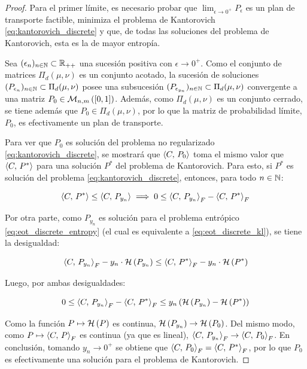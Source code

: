 \begin{proof}
	Para el primer límite, es necesario probar que $\lim_{\epsilon\to 0^+} P_\epsilon$ es un plan de transporte factible, minimiza el problema de Kantorovich \eqref{eq:kantorovich_discrete} y que, de todas las soluciones del problema de Kantorovich, esta es la de mayor entropía.

	Sea $(\epsilon_n)_{n\in\mathbb{N}}\subset\mathbb{R}_{++}$ una sucesión positiva con $\epsilon\to 0^+$. Como el conjunto de matrices $\Pi_d(\mu,\nu)$ es un conjunto acotado, la sucesión de soluciones $(P_{\epsilon_n})_{n\in\mathbb{N}}\subset\Pi_d(\mu,\nu)$ posee una subsucesión $(P_{\epsilon_{y_n}})_{n\in\mathbb{N}}\subset\Pi_d(\mu,\nu)$ convergente a una matriz $P_0\in\mathcal{M}_{n,m}\left([0,1]\right)$. Además, como $\Pi_d(\mu,\nu)$ es un conjunto cerrado, se tiene además que $P_0\in\Pi_d(\mu,\nu)$, por lo que la matriz de probabilidad límite, $P_0$, es efectivamente un plan de transporte.

	Para ver que $P_0$ es solución del problema no regularizado \eqref{eq:kantorovich_discrete}, se mostrará que $\left\langle C,\,P_0\right\rangle$ toma el mismo valor que $\left\langle C,\,P^*\right\rangle$ para una solución $P^*$ del problema de Kantorovich. Para esto, si $P^*$ es solución del problema \eqref{eq:kantorovich_discrete}, entonces, para todo $n\in\mathbb{N}$:

	\begin{equation*}
		\left\langle C,\,P^*\right\rangle \leq \left\langle C,\,P_{y_n}\right\rangle
		\implies
		0 \leq \left\langle C,\,P_{y_n}\right\rangle_F - \left\langle C,\,P^*\right\rangle_F
	\end{equation*}

	Por otra parte, como $P_{y_n}$ es solución para el problema entrópico \eqref{eq:eot_discrete_entropy} (el cual es equivalente a \eqref{eq:eot_discrete_kl}), se tiene la desigualdad:

	\begin{equation*}
		\left\langle C,\,P_{y_n}\right\rangle_F - y_n\cdot\mathcal{H}\left(P_{y_n}\right)
		\leq \left\langle C,\,P^*\right\rangle_F - y_n\cdot\mathcal{H}\left(P^*\right)
	\end{equation*}

	Luego, por ambas desigualdades:

	\begin{equation}
		\label{eq:eot_convergence_proof}
		0 \leq \left\langle C,\,P_{y_n}\right\rangle_F - \left\langle C,\,P^*\right\rangle_F
		\leq y_n\left(\mathcal{H}\left(P_{y_n}\right) - \mathcal{H}\left(P^*\right)\right)
	\end{equation}

	Como la función $P\mapsto\mathcal{H}\left(P\right)$ es continua, $\mathcal{H}\left(P_{y_n}\right) \to \mathcal{H}\left(P_0\right)$. Del mismo modo, como $P\mapsto\left\langle C,\,P\right\rangle_F$ es continua (ya que es lineal), $\left\langle C,\,P_{y_n}\right\rangle_F\to\left\langle C,\,P_0\right\rangle_F$. En conclusión, tomando $y_n\to 0^+$ se obtiene que $\left\langle C,\,P_0\right\rangle_F = \left\langle C,\,P^*\right\rangle_F$, por lo que $P_0$ es efectivamente una solución para el problema de Kantorovich.


\end{proof}
